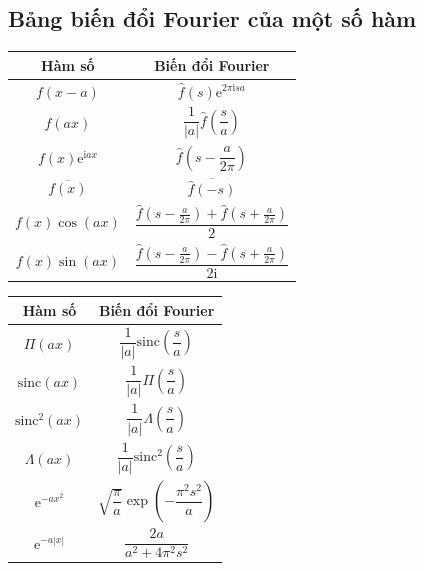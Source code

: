 \documentclass[10pt, a4paper]{article}
\begin{document}
	\subsection{Bảng biến đổi Fourier của một số hàm}
	\begin{multicols}{2}
		\begin{center}
			\renewcommand{\arraystretch}{2.0}
			\begin{tabular}{|c|c|}
				\hline
				\textbf{\color{red}Hàm số} & \textbf{\color{red}Biến đổi Fourier} \\ \hline 
				$f(x-a)$ & $\widehat f(s)\mathrm e^{2\pi\text{i}sa}$ \\[4pt] \hline 
				$f(ax)$ & $\dfrac{1}{|a|}\widehat f\left(\dfrac sa\right)$ \\[4pt] \hline 
				$f(x)\mathrm e^{\text{i}ax}$ & $\widehat f\left(s-\dfrac{a}{2\pi}\right)$ \\[4pt] \hline
				$\overline{f(x)}$ & $\overline{\widehat f(-s)}$ \\[4pt] \hline
				$f(x)\cos(ax)$ & $\dfrac{\widehat f\left(s-\frac{a}{2\pi}\right)+\widehat f\left(s+\frac{a}{2\pi}\right)}{2}$ \\[4pt] \hline
				$f(x)\sin(ax)$ & $\dfrac{\widehat f\left(s-\frac{a}{2\pi}\right)-\widehat f\left(s+\frac{a}{2\pi}\right)}{2\text{i}}$ \\[4pt] \hline
			\end{tabular}
		\end{center}
		\columnbreak
		\begin{center}
			\renewcommand{\arraystretch}{2.0}
			\begin{tabular}{|c|c|}
				\hline
				\textbf{\color{red}Hàm số} & \textbf{\color{red}Biến đổi Fourier} \\ \hline 
				$\Pi(ax)$ & $\dfrac{1}{|a|}\text{sinc}\left(\dfrac sa\right)$ \\[4pt] \hline 
				$\text{sinc}(ax)$ & $\dfrac{1}{|a|}\Pi\left(\dfrac sa\right)$ \\[4pt] \hline 
				$\text{sinc}^2(ax)$ & $\dfrac{1}{|a|}\Lambda\left(\dfrac sa\right)$ \\[4pt] \hline
				$\Lambda(ax)$ & $\dfrac{1}{|a|}\text{sinc}^2\left(\dfrac sa\right)$ \\[4pt] \hline
				$\mathrm e^{-ax^2}$ & $\sqrt{\dfrac\pi a}\exp\left(-\dfrac{\pi^2s^2}{a}\right)$ \\[4pt] \hline
				$\mathrm e^{-a|x|}$ & $\dfrac{2a}{a^2+4\pi^2s^2}$ \\[4pt] \hline
			\end{tabular}
		\end{center}
	\end{multicols}
\end{document}
